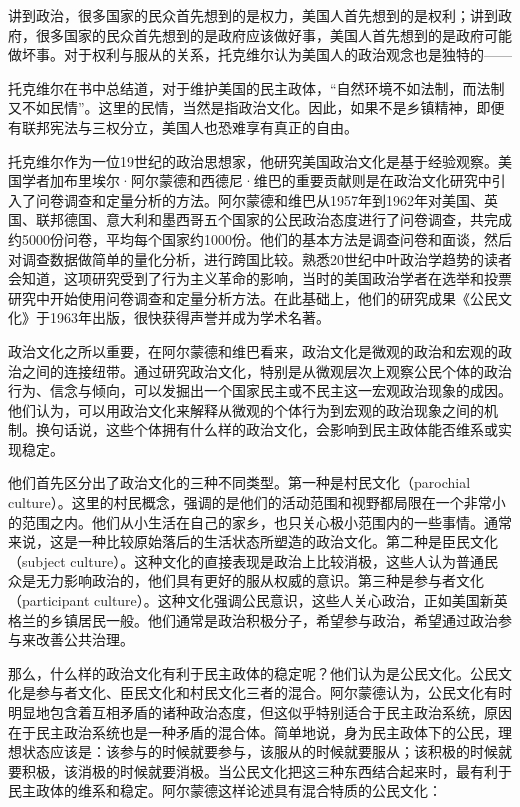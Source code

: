 讲到政治，很多国家的民众首先想到的是权力，美国人首先想到的是权利；讲到政府，很多国家的民众首先想到的是政府应该做好事，美国人首先想到的是政府可能做坏事。对于权利与服从的关系，托克维尔认为美国人的政治观念也是独特的——


托克维尔在书中总结道，对于维护美国的民主政体，“自然环境不如法制，而法制又不如民情”。这里的民情，当然是指政治文化。因此，如果不是乡镇精神，即便有联邦宪法与三权分立，美国人也恐难享有真正的自由。


托克维尔作为一位19世纪的政治思想家，他研究美国政治文化是基于经验观察。美国学者加布里埃尔·阿尔蒙德和西德尼·维巴的重要贡献则是在政治文化研究中引入了问卷调查和定量分析的方法。阿尔蒙德和维巴从1957年到1962年对美国、英国、联邦德国、意大利和墨西哥五个国家的公民政治态度进行了问卷调查，共完成约5000份问卷，平均每个国家约1000份。他们的基本方法是调查问卷和面谈，然后对调查数据做简单的量化分析，进行跨国比较。熟悉20世纪中叶政治学趋势的读者会知道，这项研究受到了行为主义革命的影响，当时的美国政治学者在选举和投票研究中开始使用问卷调查和定量分析方法。在此基础上，他们的研究成果《公民文化》于1963年出版，很快获得声誉并成为学术名著。

政治文化之所以重要，在阿尔蒙德和维巴看来，政治文化是微观的政治和宏观的政治之间的连接纽带。通过研究政治文化，特别是从微观层次上观察公民个体的政治行为、信念与倾向，可以发掘出一个国家民主或不民主这一宏观政治现象的成因。他们认为，可以用政治文化来解释从微观的个体行为到宏观的政治现象之间的机制。换句话说，这些个体拥有什么样的政治文化，会影响到民主政体能否维系或实现稳定。

他们首先区分出了政治文化的三种不同类型。第一种是村民文化（parochial culture）。这里的村民概念，强调的是他们的活动范围和视野都局限在一个非常小的范围之内。他们从小生活在自己的家乡，也只关心极小范围内的一些事情。通常来说，这是一种比较原始落后的生活状态所塑造的政治文化。第二种是臣民文化（subject culture）。这种文化的直接表现是政治上比较消极，这些人认为普通民众是无力影响政治的，他们具有更好的服从权威的意识。第三种是参与者文化（participant culture）。这种文化强调公民意识，这些人关心政治，正如美国新英格兰的乡镇居民一般。他们通常是政治积极分子，希望参与政治，希望通过政治参与来改善公共治理。

那么，什么样的政治文化有利于民主政体的稳定呢？他们认为是公民文化。公民文化是参与者文化、臣民文化和村民文化三者的混合。阿尔蒙德认为，公民文化有时明显地包含着互相矛盾的诸种政治态度，但这似乎特别适合于民主政治系统，原因在于民主政治系统也是一种矛盾的混合体。简单地说，身为民主政体下的公民，理想状态应该是：该参与的时候就要参与，该服从的时候就要服从；该积极的时候就要积极，该消极的时候就要消极。当公民文化把这三种东西结合起来时，最有利于民主政体的维系和稳定。阿尔蒙德这样论述具有混合特质的公民文化：


